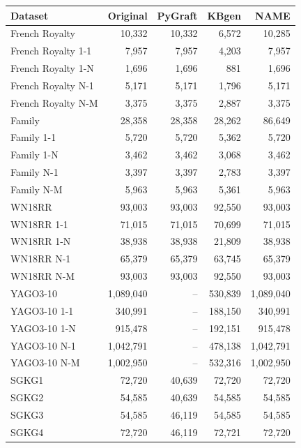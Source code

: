 \begin{tabular}{lrrrr}
\toprule
Dataset & Original & PyGraft & KBgen & NAME \\
\midrule
French Royalty & 10{,}332 & 10{,}332 & 6{,}572 & 10{,}285 \\
French Royalty 1-1 & 7{,}957 & 7{,}957 & 4{,}203 & 7{,}957 \\
French Royalty 1-N & 1{,}696 & 1{,}696 & 881 & 1{,}696 \\
French Royalty N-1 & 5{,}171 & 5{,}171 & 1{,}796 & 5{,}171 \\
French Royalty N-M & 3{,}375 & 3{,}375 & 2{,}887 & 3{,}375 \\
\midrule
Family & 28{,}358 & 28{,}358 & 28{,}262 & 86{,}649 \\
Family 1-1 & 5{,}720 & 5{,}720 & 5{,}362 & 5{,}720 \\
Family 1-N & 3{,}462 & 3{,}462 & 3{,}068 & 3{,}462 \\
Family N-1 & 3{,}397 & 3{,}397 & 2{,}783 & 3{,}397 \\
Family N-M & 5{,}963 & 5{,}963 & 5{,}361 & 5{,}963 \\
\midrule
WN18RR & 93{,}003 & 93{,}003 & 92{,}550 & 93{,}003 \\
WN18RR 1-1 & 71{,}015 & 71{,}015 & 70{,}699 & 71{,}015 \\
WN18RR 1-N & 38{,}938 & 38{,}938 & 21{,}809 & 38{,}938 \\
WN18RR N-1 & 65{,}379 & 65{,}379 & 63{,}745 & 65{,}379 \\
WN18RR N-M & 93{,}003 & 93{,}003 & 92{,}550 & 93{,}003 \\
\midrule
YAGO3-10 & 1{,}089{,}040 & – & 530{,}839 & 1{,}089{,}040 \\
YAGO3-10 1-1 & 340{,}991 & – & 188{,}150 & 340{,}991 \\
YAGO3-10 1-N & 915{,}478 & – & 192{,}151 & 915{,}478 \\
YAGO3-10 N-1 & 1{,}042{,}791 & – & 478{,}138 & 1{,}042{,}791 \\
YAGO3-10 N-M & 1{,}002{,}950 & – & 532{,}316 & 1{,}002{,}950 \\
\midrule
SGKG1 & 72{,}720 & 40{,}639 & 72{,}720 & 72{,}720 \\
SGKG2 & 54{,}585 & 40{,}639 & 54{,}585 & 54{,}585 \\
SGKG3 & 54{,}585 & 46{,}119 & 54{,}585 & 54{,}585 \\
SGKG4 & 72{,}720 & 46{,}119 & 72{,}721 & 72{,}720 \\
\bottomrule
\end{tabular}
